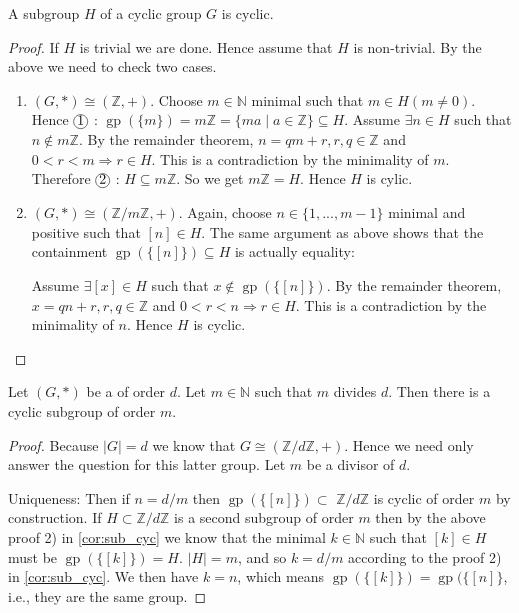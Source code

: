 \documentclass{article}
\newcommand*\circled[1]{\tikz[baseline=(char.base)]{
    \node[shape=circle, draw, inner sep=0.1pt, 
        minimum height=5pt] (char) {\vphantom{1g}#1};}}
\newcommand{\gp}{\operatorname{gp}}
\begin{document}
\begin{cora}\label{cor:sub_cyc}
A subgroup  $H$ of a cyclic group  $G$ is cyclic.
\end{cora} 
\begin{proof}If $H$ is trivial  we are done. Hence assume that $H$ is non-trivial. By the above we need to check two cases.
\begin{enumerate}
    \item  $(G, *) \cong(\mathbb{Z},+)$. Choose $m \in \mathbb{N}$ minimal such that $m \in H(m \neq 0) .$ Hence $\circled{1}$ : $\gp(\{m\})=m \mathbb{Z}=\{m a \mid a \in \mathbb{Z}\} \subseteq H .$   Assume  $\exists n \in H$ such that $n \notin m \mathbb{Z} .$ By the remainder theorem, $n=q m+r, r, q \in \mathbb{Z}$ and $0<r<m \Rightarrow r \in H$. This is a contradiction by the minimality of $m$. Therefore $\circled{2}$ : $H\subseteq m \mathbb{Z}$. So we get $m \mathbb{Z}=H$. Hence $H$ is cylic.
\item $(G, *) \cong(\mathbb{Z} / m \mathbb{Z},+)$. Again, choose $n \in \{1,...,m-1\}$ minimal and positive such that $[n] \in H$. The same argument as above shows that the containment $\gp(\{[n]\}) \subseteq H$ is actually equality: 

Assume  $\exists [x] \in H$ such that $x \notin \gp(\{[n]\}) .$ By the remainder theorem, $x=qn+r, r, q \in \mathbb{Z}$ and $0<r<n \Rightarrow r \in H$. This is a contradiction by the minimality of $n$.
Hence $H$ is cyclic.
\end{enumerate}
\end{proof} 

\begin{thma}
Let $(G, *)$ be a  of order $d .$ Let $m \in \mathbb{N}$ such that $m$ divides $d$. Then there is a  cyclic subgroup of order $m$.
\end{thma} 
\begin{proof}
Because $|G|=d$ we know that $G \cong(\mathbb{Z} / d \mathbb{Z},+) .$ Hence we need only answer the question for this latter group. Let $m$ be a divisor of $d$. 

Uniqueness:
Then if $n=d / m$ then $\gp(\{[n]\}) \subset$ $\mathbb{Z} / d \mathbb{Z}$ is cyclic of order $m$ by construction. If $H \subset \mathbb{Z} / d \mathbb{Z}$ is a second subgroup of order $m$ then by the above proof 2) in \cref{cor:sub_cyc} we know that the minimal $k \in \mathbb{N}$ such that $[k] \in H$ must be $\gp(\{[k]\}) = H$. $|H|=m$, and so $k=d / m$ according to the proof 2) in \cref{cor:sub_cyc}. We then have $k=n$, which means $\gp(\{[k]\})=\gp(\{[n]\}$, i.e., they are the same group.
\end{proof} 
\end{document}
